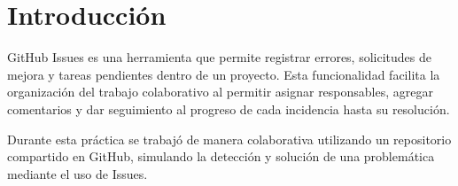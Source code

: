 \section{Introducción}

GitHub Issues es una herramienta que permite registrar errores, solicitudes de mejora y tareas pendientes dentro de un proyecto. Esta funcionalidad facilita la organización del trabajo colaborativo al permitir asignar responsables, agregar comentarios y dar seguimiento al progreso de cada incidencia hasta su resolución.

Durante esta práctica se trabajó de manera colaborativa utilizando un repositorio compartido en GitHub, simulando la detección y solución de una problemática mediante el uso de Issues. 
